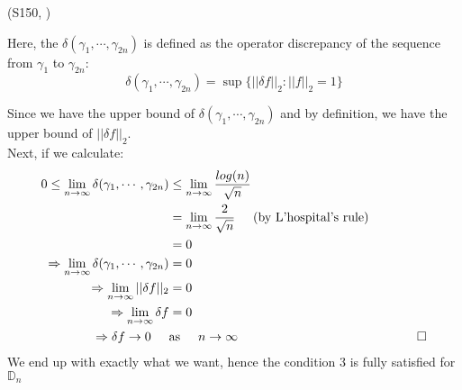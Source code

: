 \documentclass[12pt]{article}
\numberwithin{equation}{section}
\let\bb\mathbb
\let\bb\mathbb
\begin{document}
		(S150, \cite{lubotzky_1986_hecke})
		
		Here, the $\delta(\gamma_1, \cdots, \gamma_{2n})$ is defined as the operator discrepancy of the sequence from $\gamma_1$ to $\gamma_{2n}$:
		\[\delta(\gamma_1, \cdots, \gamma_{2n}) = \sup\{||\delta f||_2 : ||f||_2 = 1\} \]
		
		Since we have the upper bound of $\delta(\gamma_1, \cdots, \gamma_{2n})$ and by definition, we have the upper bound of $||\delta f||_2$.\\
		Next, if we calculate:
		\begin{align*}
			0 \leq \lim_{n\rightarrow \infty} \delta(\gamma_1, \cdots, \gamma_{2n}) &\leq \lim_{n\rightarrow \infty} \frac{log(n)}{\sqrt{n}} \\
			& = \lim_{n\rightarrow \infty} \frac{2}{\sqrt{n}} \hspace{5mm} \text {(by L'hospital's rule)} \\
			& = 0\\
			\Rightarrow \lim_{n\rightarrow \infty} \delta(\gamma_1, \cdots, \gamma_{2n}) &= 0\\
			\Rightarrow \lim_{n\rightarrow \infty} ||\delta f||_2 &= 0 \\
			\Rightarrow \lim_{n\rightarrow \infty} \delta f &= 0 \\
			\Rightarrow \delta f  \rightarrow 0 \hspace{5mm}&\text{as} \hspace{5mm} n \rightarrow \infty \hspace{50mm} \square
		\end{align*}
		We end up with exactly what we want, hence the condition 3 is fully satisfied for $\bb{D}_n$

	\newpage
	\nocite{*}
	\printbibliography
	
\end{document}
